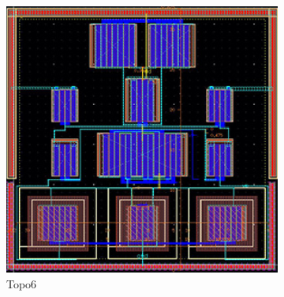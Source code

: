 \begin{figure}[ht]
\begin{subfigure}[t]{0.2\textwidth}
        \includegraphics[width=\textwidth]{Fig/MultTopo_Topo6.eps}
        \caption{Topo6}\label{fig:Topo6}
        \end{subfigure}
        \begin{subfigure}[t]{0.2\textwidth}

\end{subfigure}
\end{figure}
